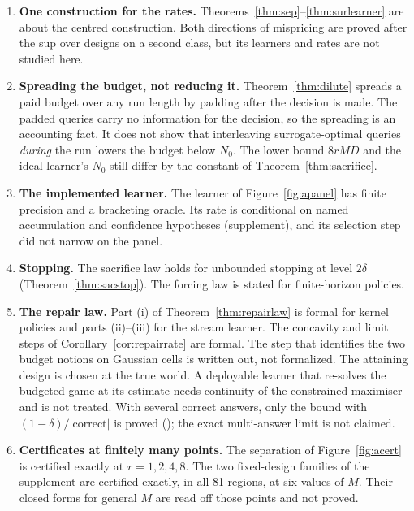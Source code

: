 \begin{enumerate}
\item[1)] \textbf{One construction for the rates.} Theorems~\ref{thm:sep}--\ref{thm:surlearner}
are about the centred construction. Both directions of mispricing are proved after the sup over
designs on a second class, but its learners and rates are not studied here.
\item[2)] \textbf{Spreading the budget, not reducing it.} Theorem~\ref{thm:dilute} spreads a
paid budget over any run length by padding after the decision is made. The padded queries carry
no information for the decision, so the spreading is an accounting fact. It does not show that
interleaving surrogate-optimal queries \emph{during} the run lowers the budget below $N_{0}$.
The lower bound $8rMD$ and the ideal learner's $N_{0}$ still differ by the constant of
Theorem~\ref{thm:sacrifice}.
\item[3)] \textbf{The implemented learner.} The learner of Figure~\ref{fig:apanel} has finite
precision and a bracketing oracle. Its rate is conditional on named accumulation and
confidence hypotheses (supplement), and its selection step did not narrow on the panel.
\item[4)] \textbf{Stopping.} The sacrifice law holds for unbounded stopping at level $2\delta$
(Theorem~\ref{thm:sacstop}). The forcing law is stated for finite-horizon policies.
\item[5)] \textbf{The repair law.} Part (i) of Theorem~\ref{thm:repairlaw} is formal for kernel
policies and parts (ii)--(iii) for the stream learner. The concavity and limit steps of
Corollary~\ref{cor:repairrate} are formal. The step that identifies the two budget notions on
Gaussian cells is written out, not formalized. The attaining design is chosen at
the true world. A deployable learner that re-solves the budgeted game at its estimate needs
continuity of the constrained maximiser and is not treated. With several correct answers, only
the bound with $(1-\delta)/|\text{correct}|$ is proved (); the exact
multi-answer limit is not claimed.
\item[6)] \textbf{Certificates at finitely many points.} The separation of
Figure~\ref{fig:acert} is certified exactly at $r=1,2,4,8$. The two fixed-design families of the
supplement are certified exactly, in all 81 regions, at six values of $M$. Their closed forms for
general $M$ are read off those points and not proved.
\end{enumerate}

